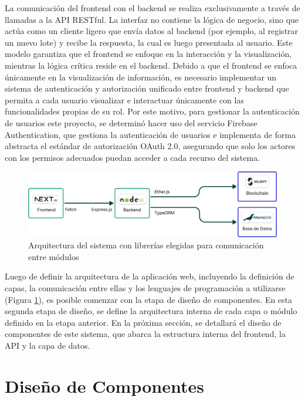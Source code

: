 La comunicación del frontend con el backend se realiza exclusivamente a través de llamadas a la API RESTful. La interfaz no contiene la lógica de negocio, sino que actúa como un cliente ligero que envía datos al backend (por ejemplo, al registrar un nuevo lote) y recibe la respuesta, la cual es luego presentada al usuario. Este modelo garantiza que el frontend se enfoque en la interacción y la visualización, mientras la lógica crítica reside en el backend. Debido a que el frontend se enfoca únicamente en la visualización de información, es necesario implementar un sistema de autenticación y autorización unificado entre frontend y backend que permita a cada usuario visualizar e interactuar únicamente con las funcionalidades propias de su rol. Por este motivo, para gestionar la autenticación de usuarios este proyecto, se determinó hacer uso del servicio Firebase Authentication, que gestiona la autenticación de usuarios e implementa de forma abstracta el estándar de autorización OAuth 2.0, asegurando que solo los actores con los permisos adecuados puedan acceder a cada recurso del sistema.

\begin{figure}[!htb]
    \centering
    \includegraphics[width=\linewidth]{Figures/system-architecture.png}
    \caption{Arquitectura del sistema con librerías elegidas para comunicación entre módulos}
    \label{fig:system-architecture}
\end{figure}


Luego de definir la arquitectura de la aplicación web, incluyendo la definición de capas, la comunicación entre ellas y los lenguajes de programación a utilizarse (Figura \ref{fig:system-architecture}), es posible comenzar con la etapa de diseño de componentes. En esta segunda etapa de diseño, se define la arquitectura interna de cada capa o módulo definido en la etapa anterior. En la próxima sección, se detallará el diseño de componentes de este sistema, que abarca la estructura interna del frontend, la API y la capa de datos.

\section{Diseño de Componentes}
\label{sec:components-design}

